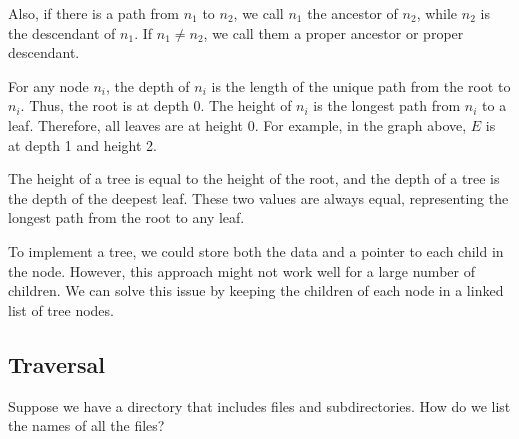 Also, if there is a path from \(n_1\) to \(n_2\), we call \(n_1\) the ancestor of \(n_2\), while \(n_2\) is the descendant of \(n_1\). If \(n_1 \neq n_2\), we call them a proper ancestor or proper descendant.

For any node \(n_i\), the depth of \(n_i\) is the length of the unique path from the root to \(n_i\). Thus, the root is at depth 0. The height of \(n_i\) is the longest path from \(n_i\) to a leaf. Therefore, all leaves are at height 0. For example, in the graph above, \(E\) is at depth 1 and height 2.

The height of a tree is equal to the height of the root, and the depth of a tree is the depth of the deepest leaf. These two values are always equal, representing the longest path from the root to any leaf.

To implement a tree, we could store both the data and a pointer to each child in the node. However, this approach might not work well for a large number of children. We can solve this issue by keeping the children of each node in a linked list of tree nodes.

\subsection{Traversal}
Suppose we have a directory that includes files and subdirectories. How do we list the names of all the files?

